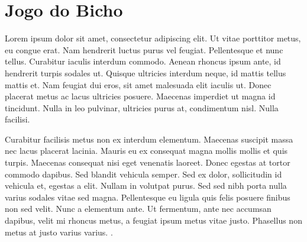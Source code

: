 \chapter{Jogo do Bicho}
\label{chap:bicho}


Lorem ipsum dolor sit amet, consectetur adipiscing elit. Ut vitae porttitor metus, eu congue erat. Nam hendrerit luctus purus vel feugiat. Pellentesque et nunc tellus. Curabitur iaculis interdum commodo. Aenean rhoncus ipsum ante, id hendrerit turpis sodales ut. Quisque ultricies interdum neque, id mattis tellus mattis et. Nam feugiat dui eros, sit amet malesuada elit iaculis ut. Donec placerat metus ac lacus ultricies posuere. Maecenas imperdiet ut magna id tincidunt. Nulla in leo pulvinar, ultricies purus at, condimentum nisl. Nulla facilisi.

Curabitur facilisis metus non ex interdum elementum. Maecenas suscipit massa nec lacus placerat lacinia. Mauris eu ex consequat magna mollis mollis et quis turpis. Maecenas consequat nisi eget venenatis laoreet. Donec egestas at tortor commodo dapibus. Sed blandit vehicula semper. Sed ex dolor, sollicitudin id vehicula et, egestas a elit. Nullam in volutpat purus. Sed sed nibh porta nulla varius sodales vitae sed magna. Pellentesque eu ligula quis felis posuere finibus non sed velit. Nunc a elementum ante. Ut fermentum, ante nec accumsan dapibus, velit mi rhoncus metus, a feugiat ipsum metus vitae justo. Phasellus non metus at justo varius varius. \citetext{\citealp[71]{labronici2012paratodos}; \citealp[142]{misse2007illegal}}.

